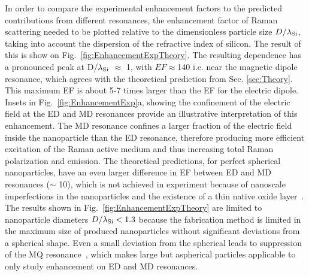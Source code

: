             In order to compare the experimental enhancement factors to the predicted contributions from different resonances, the
        enhancement factor of Raman scattering needed to be plotted relative to the dimensionless particle size $D/\lambda_{\rm Si}$,
        taking into account the dispersion of the refractive index of silicon. The result of this is show on Fig.~\ref{fig:EnhancementExpTheory}.
        The resulting dependence has a pronounced peak at D/$\lambda_{\rm Si}$ $\approx$ 1, with $EF\approx$140 i.e. near the
        magnetic dipole resonance, which agrees with the theoretical prediction from Sec. \ref{sec:Theory}. This maximum EF is about 5-7 times larger than the EF for the
        electric dipole. Insets in Fig.~\ref{fig:EnhancementExp}a, showing the confinement of the electric field at the ED and MD resonances
        provide an illustrative interpretation of this enhancement. The MD resonance confines a larger fraction of the electric field inside the
        nanoparticle than the ED resonance, therefore producing more efficient excitation of the Raman active medium and thus increasing total
        Raman polarization and emission. The theoretical predictions, for perfect spherical nanoparticles, have an even larger difference in EF
        between ED and MD resonances ($\sim$ 10), which is not achieved in experiment because of nanoscale imperfections in the nanoparticles
        and the existence of a thin native oxide layer~\cite{fu2012directional, zywietz2015electromagnetic}.
        The results shown in Fig.~\ref{fig:EnhancementExpTheory} are limited to nanoparticle diameters $D/\lambda_{\rm Si}<1.3$
        because the fabrication method is limited in the maximum size of produced nanoparticles without significant deviations from a spherical shape.
        Even a small deviation from the spherical leads to suppression of the MQ resonance~\cite{fu2012directional}, which makes large but aspherical
        particles applicable to only study enhancement on ED and MD resonances.
